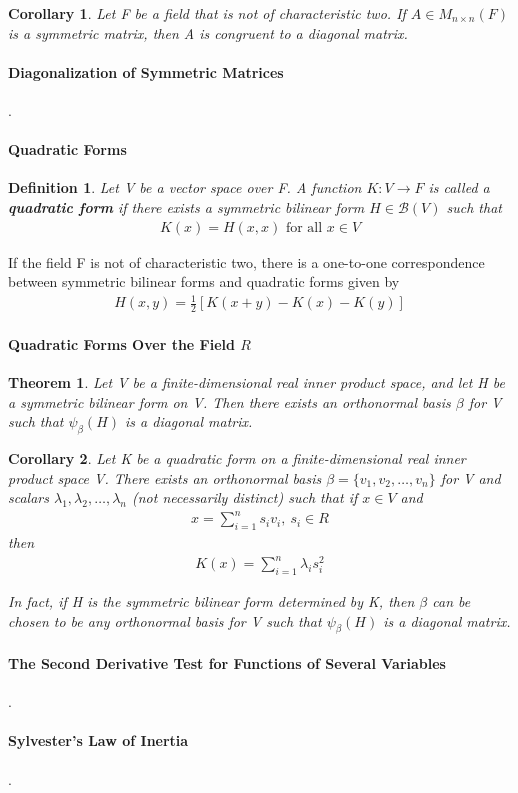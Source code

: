 \documentclass{article}
\newcommand{\bd}[1]{\textbf{#1}}
\theoremstyle{plain}
\newtheorem{theorem}{Theorem}[section]
\newtheorem*{corollary}{Corollary}
\newtheorem*{definition1}{Definition}
\theoremstyle{plain} %
\begin{document}
\begin{corollary}
  Let F be a field that is not of characteristic two. If $A \in M_{n\times n}(F)$ is a symmetric matrix, then A is congruent to a diagonal matrix.
\end{corollary}

\paragraph{Diagonalization of Symmetric Matrices}

.

\paragraph{Quadratic Forms}

\begin{definition1}
  Let V be a vector space over F. A function $K : V \to F$ is called a \bd{quadratic form} if there exists a symmetric bilinear form $H \in \mathcal B(V)$ such that
  \begin{align*}
    K(x) = H(x, x)\text{ for all } x\in V
  \end{align*}
\end{definition1}

If the field F is not of characteristic two, there is a one-to-one correspondence between symmetric bilinear forms and quadratic forms given by 
\begin{align*}
  H(x, y) = \frac{1}{2}[K(x+y)-K(x)-K(y)]
\end{align*}

\paragraph{Quadratic Forms Over the Field $R$}

\begin{theorem}
  Let V be a finite-dimensional real inner product space, and let H be a symmetric bilinear form on V. Then there exists an orthonormal basis $\beta$ for V such that $\psi_\beta(H)$ is a diagonal matrix.
\end{theorem}

\begin{corollary}
  Let K be a quadratic form on a finite-dimensional real inner
product space V. There exists an orthonormal basis $\beta = \{v_1, v_2, \ldots , v_n\}$ for V and scalars $\lambda_1, \lambda_2, \ldots , \lambda_n$ (not necessarily distinct) such that if $x \in V$ and
\begin{align*}
  x=\sum_{i=1}^n s_iv_i,~s_i\in R
\end{align*}
then
\begin{align*}
  K(x) = \sum_{i=1}^n \lambda_i s_i^2
\end{align*}

In fact, if H is the symmetric bilinear form determined by K, then $\beta$ can be chosen to be any orthonormal basis for V such that $\psi_\beta(H)$ is a diagonal matrix.
\end{corollary}

\paragraph{The Second Derivative Test for Functions of Several Variables} .

\paragraph{Sylvester’s Law of Inertia} .
\end{document}
